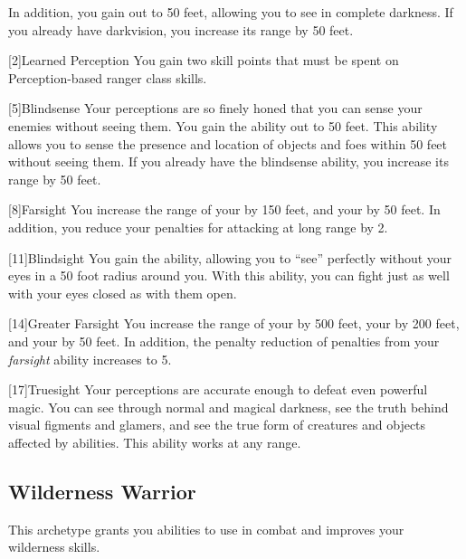         In addition, you gain  out to 50 feet, allowing you to see in complete darkness.
        If you already have darkvision, you increase its range by 50 feet.

        [2]{Learned Perception} You gain two skill points that must be spent on Perception-based ranger class skills.

        [5]{Blindsense}
        Your perceptions are so finely honed that you can sense your enemies without seeing them.
        You gain the  ability out to 50 feet.
        This ability allows you to sense the presence and location of objects and foes within 50 feet without seeing them.
        If you already have the blindsense ability, you increase its range by 50 feet.

        [8]{Farsight}
        You increase the range of your  by 150 feet, and your  by 50 feet.
        In addition, you reduce your  penalties for attacking at long range by 2.

        [11]{Blindsight}
        You gain the  ability, allowing you to ``see'' perfectly without your eyes in a 50 foot radius around you.
        With this ability, you can fight just as well with your eyes closed as with them open.

        [14]{Greater Farsight}
        You increase the range of your  by 500 feet, your  by 200 feet, and your  by 50 feet.
        In addition, the penalty reduction of  penalties from your \textit{farsight} ability increases to 5.

        [17]{Truesight} 
        Your perceptions are accurate enough to defeat even powerful magic.
        You can see through normal and magical darkness, see the truth behind visual figments and glamers, and see the true form of creatures and objects affected by  abilities.
        This ability works at any range.

    \subsection{Wilderness Warrior}
        This archetype grants you abilities to use in combat and improves your wilderness skills.


